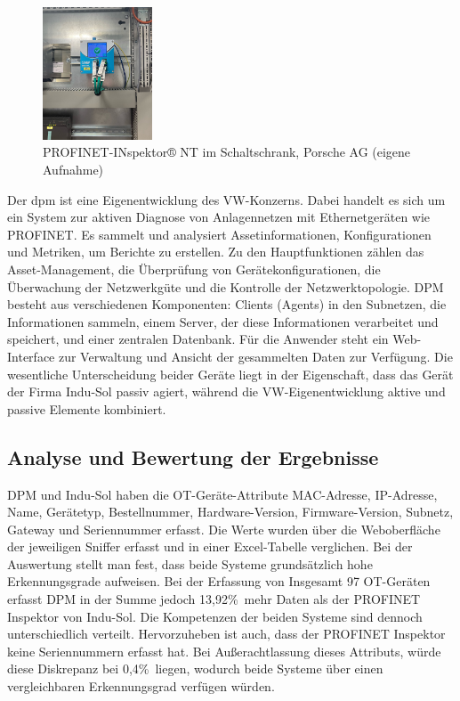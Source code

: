\begin{figure}[H]
    \centering
    \includegraphics[width=0.29\textwidth]{images/PROFINET-INspektor.jpg}
    \caption{PROFINET-INspektor® NT im Schaltschrank, Porsche AG (eigene Aufnahme)}
    \label{fig:PROFINET-INspektor® NT}
\end{figure} 
Der \ac{dpm} ist eine Eigenentwicklung des VW-Konzerns. Dabei handelt es sich um ein System zur aktiven Diagnose von Anlagennetzen mit Ethernetgeräten wie PROFINET. Es sammelt und analysiert Assetinformationen, Konfigurationen und Metriken, um Berichte zu erstellen. 
Zu den Hauptfunktionen zählen das Asset-Management, die Überprüfung von Gerätekonfigurationen, die Überwachung der Netzwerkgüte und die Kontrolle der Netzwerktopologie. DPM besteht aus verschiedenen Komponenten: Clients (Agents) in den Subnetzen, die Informationen sammeln, einem Server, der diese Informationen verarbeitet und speichert, und einer zentralen Datenbank. Für die Anwender steht ein Web-Interface zur Verwaltung und Ansicht der gesammelten Daten zur Verfügung. Die wesentliche Unterscheidung beider Geräte liegt in der Eigenschaft, dass das Gerät der Firma Indu-Sol passiv agiert, während die VW-Eigenentwicklung aktive und passive Elemente kombiniert. 

\subsection{Analyse und Bewertung der Ergebnisse}

DPM und Indu-Sol haben die OT-Geräte-Attribute MAC-Adresse, IP-Adresse, Name, Gerätetyp, Bestellnummer, Hardware-Version, Firmware-Version, Subnetz, Gateway und Seriennummer erfasst. Die Werte wurden über die Weboberfläche der jeweiligen Sniffer erfasst und in einer Excel-Tabelle verglichen. Bei der Auswertung stellt man fest, dass beide Systeme grundsätzlich hohe Erkennungsgrade aufweisen.  Bei der Erfassung von Insgesamt 97 OT-Geräten erfasst DPM in der Summe jedoch 13,92\%\ mehr Daten als der PROFINET Inspektor von Indu-Sol. 
Die Kompetenzen der beiden Systeme sind dennoch unterschiedlich verteilt. Hervorzuheben ist auch, dass der PROFINET Inspektor keine Seriennummern erfasst hat. Bei Außerachtlassung dieses Attributs, würde diese Diskrepanz bei 0,4\%\ liegen, wodurch beide Systeme über einen vergleichbaren Erkennungsgrad verfügen würden.  


